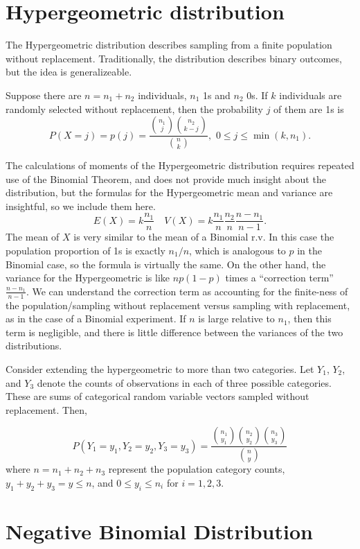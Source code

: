 \documentclass[
]{book}
\begin{document}
\hypertarget{hypergeometric-distribution}{%
\section{Hypergeometric distribution}\label{hypergeometric-distribution}}

The Hypergeometric distribution describes sampling from a finite population without replacement. Traditionally, the distribution describes binary outcomes, but the idea is generalizeable.

Suppose there are \(n = n_1 + n_2\) individuals, \(n_1\) 1s and \(n_2\) 0s. If \(k\) individuals are randomly selected without replacement, then the probability \(j\) of them are 1s is
\[P(X = j) = p(j) = \frac{{n_1 \choose j}{n_2 \choose k-j}}{{n \choose k}}, \, \, 0\leq j\leq \min(k,n_1).\]

The calculations of moments of the Hypergeometric distribution requires repeated use of the Binomial Theorem, and does not provide much insight about the distribution, but the formulas for the Hypergeometric mean and variance are insightful, so we include them here.
\[E(X) = k\frac{n_1}{n}\quad V(X) = k\frac{n_1}{n}\frac{n_2}{n}\frac{n-n_1}{n-1}.\]
The mean of \(X\) is very similar to the mean of a Binomial r.v. In this case the population proportion of 1s is exactly \(n_1/n\), which is analogous to \(p\) in the Binomial case, so the formula is virtually the same. On the other hand, the variance for the Hypergeometric is like \(np(1-p)\) times a ``correction term'' \(\frac{n-n_1}{n-1}\). We can understand the correction term as accounting for the finite-ness of the population/sampling without replacement versus sampling with replacement, as in the case of a Binomial experiment. If \(n\) is large relative to \(n_1\), then this term is negligible, and there is little difference between the variances of the two distributions.

Consider extending the hypergeometric to more than two categories. Let \(Y_1\), \(Y_2\), and \(Y_3\) denote the counts of observations in each of three possible categories. These are sums of categorical random variable vectors sampled without replacement. Then,

\[P(Y_1 = y_1, Y_2 = y_2, Y_3 = y_3) = \frac{{n_1\choose y_1}{n_2\choose y_2}{n_3\choose y_3}}{{n \choose y}}\]
where \(n = n_1+n_2+n_3\) represent the population category counts, \(y_1 + y_2 + y_3 = y \leq n\), and \(0\leq y_i\leq n_i\) for \(i=1,2,3\).

\hypertarget{negative-binomial-distribution}{%
\section{Negative Binomial Distribution}\label{negative-binomial-distribution}}
\end{document}
